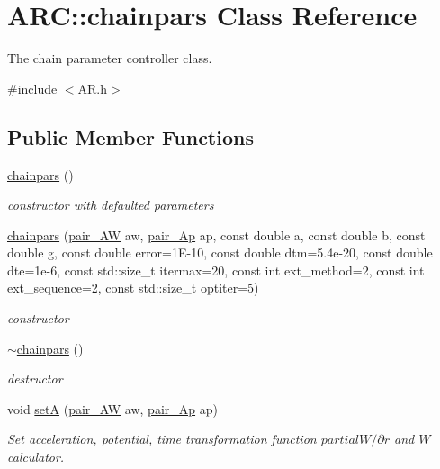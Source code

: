 \hypertarget{classARC_1_1chainpars}{}\section{A\+RC\+:\+:chainpars Class Reference}
\label{classARC_1_1chainpars}


The chain parameter controller class.  




{\ttfamily \#include $<$A\+R.\+h$>$}

\subsection*{Public Member Functions}
\begin{DoxyCompactItemize}
\item 
\hyperlink{classARC_1_1chainpars_a2019a609d85e2b801f306ac8c7f268ab}{chainpars} ()
\begin{DoxyCompactList}\small\item\em constructor with defaulted parameters \end{DoxyCompactList}\item 
\hyperlink{classARC_1_1chainpars_a91f5e98d8c936357b88a85e91924d2a2}{chainpars} (\hyperlink{namespaceARC_a5c4308ca4a8d0e0ff59fdce30f00274c}{pair\+\_\+\+AW} aw, \hyperlink{namespaceARC_a819446c4644b3a3af7ef11574d0b55e0}{pair\+\_\+\+Ap} ap, const double a, const double b, const double g, const double error=1\+E-\/10, const double dtm=5.\+4e-\/20, const double dte=1e-\/6, const std\+::size\+\_\+t itermax=20, const int ext\+\_\+method=2, const int ext\+\_\+sequence=2, const std\+::size\+\_\+t optiter=5)
\begin{DoxyCompactList}\small\item\em constructor \end{DoxyCompactList}\item 
\hyperlink{classARC_1_1chainpars_a032873f782645efb6e60dc77f6d425dc}{$\sim$chainpars} ()
\begin{DoxyCompactList}\small\item\em destructor \end{DoxyCompactList}\item 
void \hyperlink{classARC_1_1chainpars_af639f7bc8cfbb2a0330f079df2fd556e}{setA} (\hyperlink{namespaceARC_a5c4308ca4a8d0e0ff59fdce30f00274c}{pair\+\_\+\+AW} aw, \hyperlink{namespaceARC_a819446c4644b3a3af7ef11574d0b55e0}{pair\+\_\+\+Ap} ap)
\begin{DoxyCompactList}\small\item\em Set acceleration, potential, time transformation function $partial W/\partial r$ and $W$ calculator. \end{DoxyCompactList}\item 

\end{DoxyCompactItemize}
